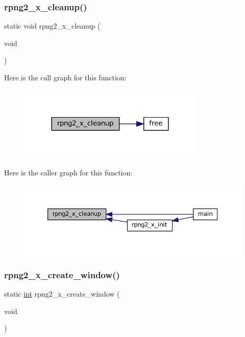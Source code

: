 \subsubsection{\texorpdfstring{rpng2\+\_\+x\+\_\+cleanup()}{rpng2\_x\_cleanup()}}
{\footnotesize\ttfamily static void rpng2\+\_\+x\+\_\+cleanup (\begin{DoxyParamCaption}\item[{void}]{ }\end{DoxyParamCaption})\hspace{0.3cm}{\ttfamily [static]}}

Here is the call graph for this function\+:
\nopagebreak
\begin{figure}[H]
\begin{center}
\leavevmode
\includegraphics[width=251pt]{rpng2-x_8c_aca1959fe9e81b967dfd94fa218c72e84_cgraph}
\end{center}
\end{figure}
Here is the caller graph for this function\+:
\nopagebreak
\begin{figure}[H]
\begin{center}
\leavevmode
\includegraphics[width=350pt]{rpng2-x_8c_aca1959fe9e81b967dfd94fa218c72e84_icgraph}
\end{center}
\end{figure}
\mbox{\label{rpng2-x_8c_aa1d3f0f82dec46874ea19ffa781cb1f7}} 
\subsubsection{\texorpdfstring{rpng2\+\_\+x\+\_\+create\+\_\+window()}{rpng2\_x\_create\_window()}}
{\footnotesize\ttfamily static \mbox{\hyperlink{ioapi_8h_a787fa3cf048117ba7123753c1e74fcd6}{int}} rpng2\+\_\+x\+\_\+create\+\_\+window (\begin{DoxyParamCaption}\item[{void}]{ }\end{DoxyParamCaption})\hspace{0.3cm}{\ttfamily [static]}}

